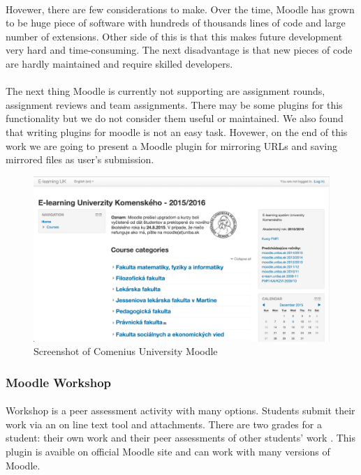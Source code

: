 \paragraph{}
Hovewer, there are few considerations to make. Over the time, Moodle has grown to be huge piece of software with hundreds of thousands lines of code and large number of extensions. Other side of this is that this makes future development very hard and time-consuming. The next disadvantage is that new pieces of code are hardly maintained and require skilled developers.

\paragraph{}
The next thing Moodle is currently not supporting are assignment rounds, assignment reviews and team assignments. There may be some plugins for this functionality but we do not consider them useful or maintained. We also found that writing plugins for moodle is not an easy task. Hovewer, on the end of this work we are going to present a Moodle plugin for mirroring URLs and saving mirrored files as user's submission.

\begin{figure}[t]
    \centering
    \includegraphics[width=\textwidth]{courses/moodle.png}
    \caption{Screenshot of Comenius University Moodle}
    \label{moodle_pic}
\end{figure}

\subsubsection{Moodle Workshop}
\paragraph{}
Workshop is a peer assessment activity with many options. Students submit their work via an on line text tool and attachments. There are two grades for a student: their own work and their peer assessments of other students' work
\cite{moodleworkshop}. This plugin is avaible on official Moodle site and can work with many versions of Moodle. 

